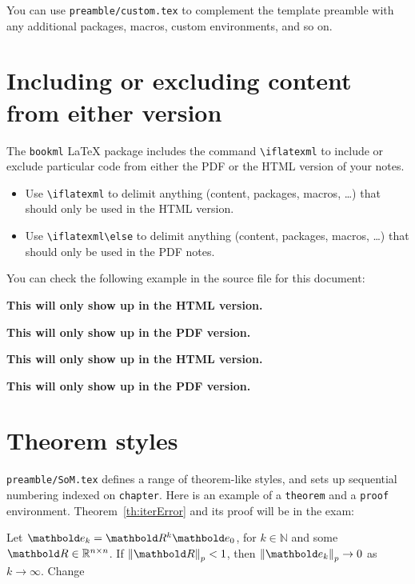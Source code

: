 You can use \texttt{preamble/custom.tex} to complement the template preamble with any additional packages, macros, custom environments, and so on.


\section{Including or excluding content from either version}
\label{demo:ifpdf}

The \texttt{bookml} \LaTeX{} package includes the command \verb|\iflatexml| to include or exclude particular code from either the PDF or the HTML version of your notes.

\begin{itemize}
    \item Use \verb|\iflatexml| to delimit anything (content, packages, macros, \ldots) that should only be used in the HTML version.
    \item Use \verb|\iflatexml\else| to delimit anything (content, packages, macros, \ldots) that should only be used in the PDF notes.
\end{itemize}

You can check the following example in the source file for this document:

\iflatexml
  \textbf{This will only show up in the HTML version.}
\fi

\iflatexml
\else
  \textbf{This will only show up in the PDF version.}
\fi

\begin{snippet}
\iflatexml
  \textbf{This will only show up in the HTML version.}
\fi

\iflatexml
\else
  \textbf{This will only show up in the PDF version.}
\fi
\end{snippet}




\section{Theorem styles}
\label{demo:thm}

\texttt{preamble/SoM.tex} defines a range of theorem-like styles, and sets up sequential numbering indexed on \texttt{chapter}. Here is an example of a \texttt{theorem} and a \texttt{proof} environment.
Theorem~\ref{th:iterError} and its proof will be in the exam:

\begin{theorem}
  \label{th:iterError}
  Let $\vect{e}_k= \mat{R}^k\vect{e}_0$, for $k\in \mathbb{N}$ and some $\mat{R}\in \R^{n\times n}$. If $\norm{\mat{R}}_p < 1$, then \mbox{$\norm{\vect{e}_k}_p \to 0$} as $k \to \infty$. Change
\end{theorem}

